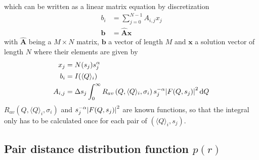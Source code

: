 which can be written as a linear matrix equation by discretization
\begin{align}
\label{eq:discreteFredholm}
b_i &= \sum_{j=0}^{N-1} A_{i,j} x_j \\
\label{eq:discreteFredholmVector}
\mathbf{b} &= \hat{\mathbf{A}}\mathbf{x}
\end{align}
with $\hat{\mathbf{A}}$ being a $M\times N$ matrix, $\mathbf{b}$ a vector of length $M$ and $\mathbf{x}$ a solution vector of length $N$ where their elements are given by
\begin{align}
x_j &= N(s_j) s_j^{\alpha}\\
b_i &= I(\langle Q\rangle_i) \\
A_{i,j} &= \Delta s_j \int_0^\infty R_{av}\left(Q,\langle Q\rangle_i,\sigma_i\right) s_j^{-\alpha} \abs{F(Q,s_j)}^2 \, \mathrm{d}Q  \label{eq:AijFF}
\end{align}
$R_{av}\left(Q,\langle Q\rangle_i,\sigma_i\right)$ and $s_j^{-\alpha}\abs{F(Q,s_j)}^2$ are known functions, so that the integral only has to be calculated once for each pair of $(\langle Q\rangle_i,s_j)$.


\subsection{Pair distance distribution function $p(r)$}
\label{sec:p(r)}

